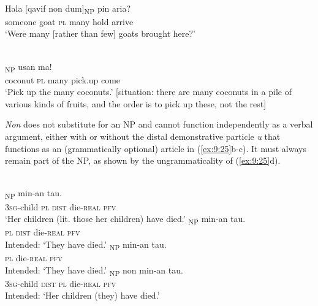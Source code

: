 \ea%
\label{ex:9:23}
 \\
\gll Hala [{qavif} non {dum}]\textsubscript{NP} pin aria{{\textglotstop}}{?} \\
  someone goat \textsc{pl} many hold arrive   \\
\glt `Were many [rather than few] goats brought here?'
\z







\ea%
\label{ex:9:24}
 \\
\textsubscript{NP} usan ma! \\
  coconut \textsc{pl} many pick.up come  \\
\glt `Pick up the many coconuts.' [situation: there are many coconuts in a pile of various kinds of fruits, and the order is to pick up these, not the rest]
\z






\textit{Non} does not substitute for an NP and cannot function independently as a verbal argument, either with or without the distal demonstrative particle \textit{u} that functions as an (grammatically optional) article in (\ref{ex:9:25}b-c). It must always remain part of the NP, as shown by the ungrammaticality of (\ref{ex:9:25}d).


\ea%
\label{ex:9:25}
 \\
\ea
{}\textsubscript{NP} min-an tau. \\
   \textsc{3sg}-child \textsc{pl} \textsc{dist} die-\textsc{real} \textsc{pfv} \\
\glt `Her children (lit. those her children) have died.'
\ex
\gll *[Non u]\textsubscript{NP} min-an tau. \\
   \textsc{pl} \textsc{dist} die-\textsc{real} \textsc{pfv} \\
\glt  Intended: `They have died.'
\ex
\gll *[{Non}]\textsubscript{NP} min-an tau. \\
    \textsc{pl} die-\textsc{real} \textsc{pfv} \\
\glt  Intended: `They have died.'
\ex
\gll *[{G-oqai}   {u}]\textsubscript{NP} non min-an tau. \\
  \textsc{3sg}-child \textsc{dist} \textsc{pl} die-\textsc{real} \textsc{pfv}  \\
\glt  Intended: `Her children (they) have died.'
\z
\z






